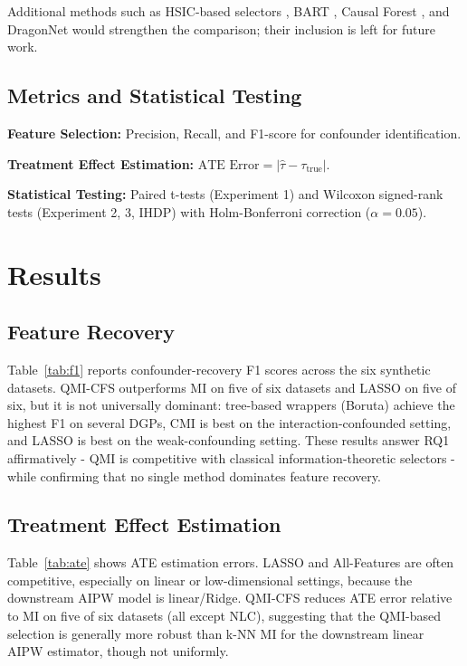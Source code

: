 \documentclass{svproc}
\begin{document}
Additional methods such as HSIC-based selectors \cite{gretton2005measuring,gretton2007kernel}, BART \cite{hill2011bayesian}, Causal Forest \cite{wager2018estimation}, and DragonNet \cite{shi2019adapting} would strengthen the comparison; their inclusion is left for future work.

\subsection{Metrics and Statistical Testing}

\textbf{Feature Selection:} Precision, Recall, and F1-score for confounder identification.

\textbf{Treatment Effect Estimation:} $\text{ATE Error} = |\hat{\tau} - \tau_{\text{true}}|$.

\textbf{Statistical Testing:} Paired t-tests (Experiment 1) and Wilcoxon signed-rank tests (Experiment 2, 3, IHDP) with Holm-Bonferroni correction ($\alpha = 0.05$).

\section{Results}
\label{sec:results}

\subsection{Feature Recovery}

Table~\ref{tab:f1} reports confounder-recovery F1 scores across the six synthetic datasets. QMI-CFS outperforms MI on five of six datasets and LASSO on five of six, but it is not universally dominant: tree-based wrappers (Boruta) achieve the highest F1 on several DGPs, CMI is best on the interaction-confounded setting, and LASSO is best on the weak-confounding setting. These results answer RQ1 affirmatively - QMI is competitive with classical information-theoretic selectors - while confirming that no single method dominates feature recovery.



\subsection{Treatment Effect Estimation}

Table~\ref{tab:ate} shows ATE estimation errors. LASSO and All-Features are often competitive, especially on linear or low-dimensional settings, because the downstream AIPW model is linear/Ridge. QMI-CFS reduces ATE error relative to MI on five of six datasets (all except NLC), suggesting that the QMI-based selection is generally more robust than k-NN MI for the downstream linear AIPW estimator, though not uniformly.
\end{document}
